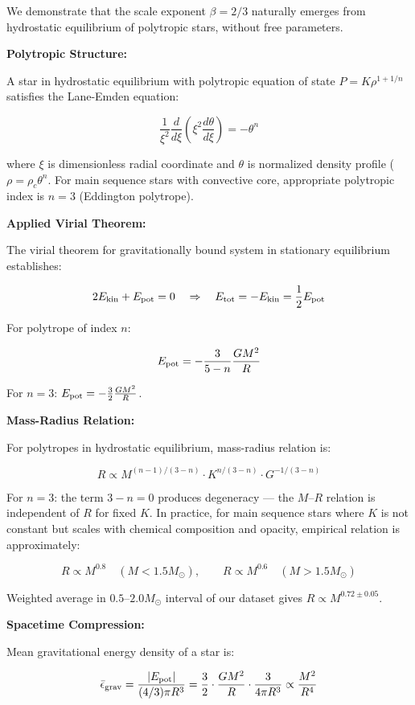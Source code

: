 \documentclass[10pt,a4paper]{article}
\begin{document}
We demonstrate that the scale exponent \(\beta = 2/3\) naturally emerges
from hydrostatic equilibrium of polytropic stars, without free
parameters.

\textbf{Polytropic Structure:}

A star in hydrostatic equilibrium with polytropic equation of state
\(P = K\rho^{1+1/n}\) satisfies the Lane-Emden equation:

\[\frac{1}{\xi^2}\frac{d}{d\xi}\left(\xi^2 \frac{d\theta}{d\xi}\right) = -\theta^n\]

where \(\xi\) is dimensionless radial coordinate and \(\theta\) is
normalized density profile (\(\rho = \rho_c \theta^n\). For main
sequence stars with convective core, appropriate polytropic index is
\(n = 3\) (Eddington polytrope).

\textbf{Applied Virial Theorem:}

The virial theorem for gravitationally bound system in stationary
equilibrium establishes:

\[2E_{\rm kin} + E_{\rm pot} = 0 \quad \Rightarrow \quad E_{\rm tot} = -E_{\rm kin} = \frac{1}{2}E_{\rm pot}\]

For polytrope of index \(n\):

\[E_{\rm pot} = -\frac{3}{5-n}\frac{GM^2}{R}\]

For \(n=3\): \(E_{\rm pot} = -\frac{3}{2}\frac{GM^2}{R}\).

\textbf{Mass-Radius Relation:}

For polytropes in hydrostatic equilibrium, mass-radius relation is:

\[R \propto M^{(n-1)/(3-n)} \cdot K^{n/(3-n)} \cdot G^{-1/(3-n)}\]

For \(n=3\): the term \(3-n = 0\) produces degeneracy --- the
\(M\)--\(R\) relation is independent of \(R\) for fixed \(K\). In
practice, for main sequence stars where \(K\) is not constant but scales
with chemical composition and opacity, empirical relation is
approximately:

\[R \propto M^{0.8} \quad (M < 1.5 M_\odot), \qquad R \propto M^{0.6} \quad (M > 1.5 M_\odot)\]

Weighted average in \(0.5\)--\(2.0 M_\odot\) interval of our dataset
gives \(R \propto M^{0.72 \pm 0.05}\).

\textbf{Spacetime Compression:}

Mean gravitational energy density of a star is:

\[\bar\epsilon_{\rm grav} = \frac{|E_{\rm pot}|}{(4/3)\pi R^3} = \frac{3}{2} \cdot \frac{GM^2}{R} \cdot \frac{3}{4\pi R^3} \propto \frac{M^2}{R^4}\]
\end{document}
